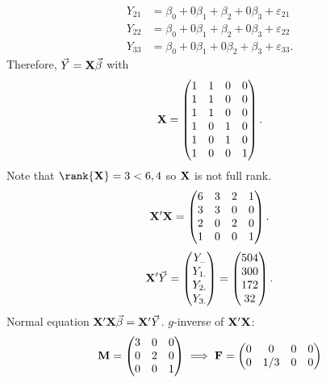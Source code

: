 \begin{Example}{}{}
\begin{align*}
        Y_{21} & =\beta_0+0\beta_1+\beta_2+0\beta_3+\varepsilon_{21}  \\
        Y_{22} & =\beta_0+0\beta_1+\beta_2+0\beta_3+\varepsilon_{22}  \\
        Y_{33} & =\beta_0+0\beta_1+0\beta_2+\beta_3+\varepsilon_{33}.
    \end{align*}
    Therefore, $ \vec{Y}=\mathbf{X}\vec{\beta} $ with
    \[ \mathbf{X}=\begin{pmatrix}
            1 & 1 & 0 & 0 \\
            1 & 1 & 0 & 0 \\
            1 & 1 & 0 & 0 \\
            1 & 0 & 1 & 0 \\
            1 & 0 & 1 & 0 \\
            1 & 0 & 0 & 1
        \end{pmatrix}. \]
    Note that $ \rank{\Matrix{X}}=3<\min{6,4} $ so $ \mathbf{X} $ is not full rank.
    \[ \mathbf{X}'\mathbf{X}=\begin{pmatrix}
            6 & 3 & 2 & 1 \\
            3 & 3 & 0 & 0 \\
            2 & 0 & 2 & 0 \\
            1 & 0 & 0 & 1
        \end{pmatrix}. \]
    \[ \mathbf{X}'\vec{Y}=\begin{pmatrix}
            Y_{..} \\
            Y_{1.} \\
            Y_{2.} \\
            Y_{3.}
        \end{pmatrix}=\begin{pmatrix}
            504 \\ 300 \\ 172 \\32
        \end{pmatrix}. \]
    Normal equation $ \mathbf{X}'\mathbf{X}\vec{\beta}=\mathbf{X}'\vec{Y} $.
    $ g $-inverse of $ \mathbf{X}'\mathbf{X} $:
    \[ \mathbf{M}=\begin{pmatrix}
            3 & 0 & 0 \\
            0 & 2 & 0 \\
            0 & 0 & 1
        \end{pmatrix}\implies
        \mathbf{F}=\begin{pmatrix}
            0 & 0   & 0   & 0 \\
            0 & 1/3 & 0   & 0 \\

\end{pmatrix}\]
\end{Example}
